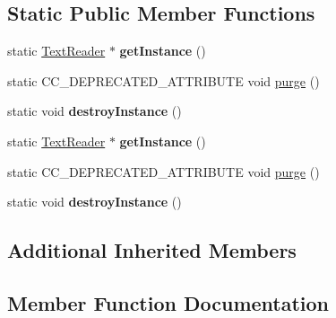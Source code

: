 \subsection*{Static Public Member Functions}
\begin{DoxyCompactItemize}
\item 
\mbox{\label{classcocostudio_1_1TextReader_af2a89bae499175a0bb356309bf759cb6}} 
static \hyperlink{classcocostudio_1_1TextReader}{Text\+Reader} $\ast$ {\bfseries get\+Instance} ()
\item 
static C\+C\+\_\+\+D\+E\+P\+R\+E\+C\+A\+T\+E\+D\+\_\+\+A\+T\+T\+R\+I\+B\+U\+TE void \hyperlink{classcocostudio_1_1TextReader_a684f3526eb1350859f153228bd8ede5e}{purge} ()
\item 
\mbox{\label{classcocostudio_1_1TextReader_a22c7788f69893e0205cbdabe30ae8c2e}} 
static void {\bfseries destroy\+Instance} ()
\item 
\mbox{\label{classcocostudio_1_1TextReader_af5efd29bc66017b62e0a0ae6a4348f1a}} 
static \hyperlink{classcocostudio_1_1TextReader}{Text\+Reader} $\ast$ {\bfseries get\+Instance} ()
\item 
static C\+C\+\_\+\+D\+E\+P\+R\+E\+C\+A\+T\+E\+D\+\_\+\+A\+T\+T\+R\+I\+B\+U\+TE void \hyperlink{classcocostudio_1_1TextReader_a684f3526eb1350859f153228bd8ede5e}{purge} ()
\item 
\mbox{\label{classcocostudio_1_1TextReader_ac5c23375dc32c849d220044feb8d3229}} 
static void {\bfseries destroy\+Instance} ()
\end{DoxyCompactItemize}
\subsection*{Additional Inherited Members}


\subsection{Member Function Documentation}
\mbox{\label{classcocostudio_1_1TextReader_a684f3526eb1350859f153228bd8ede5e}} 

